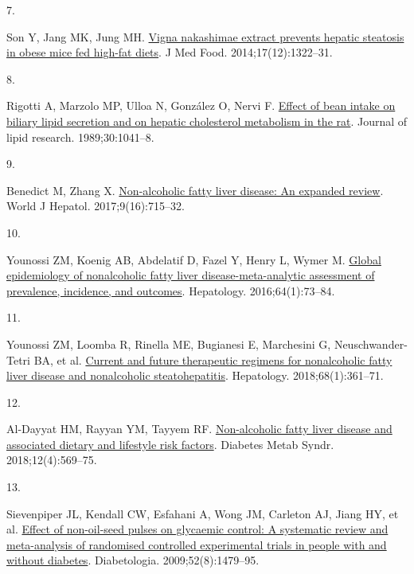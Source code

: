 \documentclass[
  11pt,
  a4paper,
  DIV=11,
  numbers=noendperiod,
  twocolumn]{scrartcl}
\newlength{\cslhangindent}
\newlength{\csllabelwidth}
\newlength{\cslentryspacingunit} %
\newenvironment{CSLReferences}[2] %
 {%
  \setlength{\parindent}{0pt}
  \ifodd #1
  \let\oldpar\par
  \def\par{\hangindent=\cslhangindent\oldpar}
  \fi
  \setlength{\parskip}{#2\cslentryspacingunit}
 }%
 {}
\newcommand{\CSLLeftMargin}[1]{\parbox[t]{\csllabelwidth}{#1}}
\newcommand{\CSLRightInline}[1]{\parbox[t]{\linewidth - \csllabelwidth}{#1}\break}
\begin{document}
\begin{CSLReferences}{0}{0}
\leavevmode{}%
\CSLLeftMargin{7. }%
\CSLRightInline{Son Y, Jang MK, Jung MH.
\href{https://doi.org/10.1089/jmf.2014.3194}{Vigna nakashimae extract
prevents hepatic steatosis in obese mice fed high-fat diets}. J Med
Food. 2014;17(12):1322--31. }

\leavevmode{}%
\CSLLeftMargin{8. }%
\CSLRightInline{Rigotti A, Marzolo MP, Ulloa N, González O, Nervi F.
\href{https://doi.org/10.1016/S0022-2275(20)38291-2}{Effect of bean
intake on biliary lipid secretion and on hepatic cholesterol metabolism
in the rat}. Journal of lipid research. 1989;30:1041--8. }

\leavevmode{}%
\CSLLeftMargin{9. }%
\CSLRightInline{Benedict M, Zhang X.
\href{https://doi.org/10.4254/wjh.v9.i16.715}{Non-alcoholic fatty liver
disease: An expanded review}. World J Hepatol. 2017;9(16):715--32. }

\leavevmode{}%
\CSLLeftMargin{10. }%
\CSLRightInline{Younossi ZM, Koenig AB, Abdelatif D, Fazel Y, Henry L,
Wymer M. \href{https://doi.org/10.1002/hep.28431}{Global epidemiology of
nonalcoholic fatty liver disease-meta-analytic assessment of prevalence,
incidence, and outcomes}. Hepatology. 2016;64(1):73--84. }

\leavevmode{}%
\CSLLeftMargin{11. }%
\CSLRightInline{Younossi ZM, Loomba R, Rinella ME, Bugianesi E,
Marchesini G, Neuschwander-Tetri BA, et al.
\href{https://doi.org/10.1002/hep.29724}{Current and future therapeutic
regimens for nonalcoholic fatty liver disease and nonalcoholic
steatohepatitis}. Hepatology. 2018;68(1):361--71. }

\leavevmode{}%
\CSLLeftMargin{12. }%
\CSLRightInline{Al-Dayyat HM, Rayyan YM, Tayyem RF.
\href{https://doi.org/10.1016/j.dsx.2018.03.016}{Non-alcoholic fatty
liver disease and associated dietary and lifestyle risk factors}.
Diabetes Metab Syndr. 2018;12(4):569--75. }

\leavevmode{}%
\CSLLeftMargin{13. }%
\CSLRightInline{Sievenpiper JL, Kendall CW, Esfahani A, Wong JM,
Carleton AJ, Jiang HY, et al.
\href{https://doi.org/10.1007/s00125-009-1395-7}{Effect of non-oil-seed
pulses on glycaemic control: A systematic review and meta-analysis of
randomised controlled experimental trials in people with and without
diabetes}. Diabetologia. 2009;52(8):1479--95. }


\end{CSLReferences}
\end{document}
